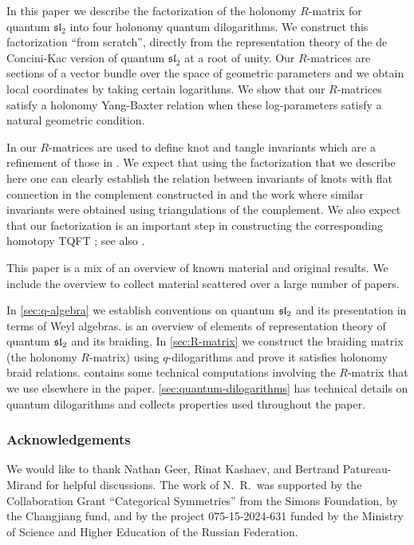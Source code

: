 \documentclass{sl2ams}
\numberwithin{equation}{section}
\begin{document}
In this paper we describe the factorization of the holonomy $R$-matrix for quantum $\mathfrak{sl}_2$ \cite{Reshetikhin1995}
into four holonomy quantum dilogarithms. We construct this factorization ``from scratch'', directly from the representation theory of the de Concini-Kac version of quantum $\mathfrak{sl}_2$ at a root of unity.
%
%
%
Our \(R\)-matrices are sections of a vector bundle over the space of geometric parameters and we obtain local coordinates by taking certain logarithms.
We show that our \(R\)-matrices satisfy a holonomy Yang-Baxter relation when these log-parameters satisfy a natural geometric condition.

In \cite{McPhailSnyderVolume} our \(R\)-matrices are used to define knot and tangle invariants which are a refinement of those in \cite{Blanchet2018}.
We expect that  using the factorization that we describe here one can clearly establish the relation 
between invariants of knots with flat connection in the complement constructed in \cite{Kashaev2005} and 
the work \cite{Baseilhac2004} where similar invariants were obtained using triangulations of the complement.
We also expect that our factorization is an important step in constructing the corresponding homotopy TQFT \cite{Turaev2010}; see also \cite{GeerBook}.

This paper is a mix of an overview of known material and original results.
We include the overview to collect material scattered over a large number of papers.

In \cref{sec:q-algebra} we establish conventions on quantum \(\mathfrak{sl}_2\) and its presentation in terms of Weyl algebras.  is an overview of elements of representation theory of quantum \(\mathfrak{sl}_2\) and its braiding.
In \cref{sec:R-matrix} we construct the braiding matrix (the holonomy $R$-matrix) using $q$-dilogarithms and prove it satisfies holonomy braid relations.
  contains some technical computations involving the \(R\)-matrix that we use elsewhere in the paper.
\cref{sec:quantum-dilogarithms} has technical details on quantum dilogarithms and collects properties used throughout the paper.


\subsubsection*{Acknowledgements}
We would like to thank Nathan Geer, Rinat Kashaev, and Bertrand Patureau-Mirand for helpful discussions. 
The work of N.~R.\ was supported by the Collaboration Grant ``Categorical Symmetries'' from
the Simons Foundation, by the Changjiang fund, and by the project 075-15-2024-631 funded
by the Ministry of Science and Higher Education of the Russian Federation.
\end{document}
